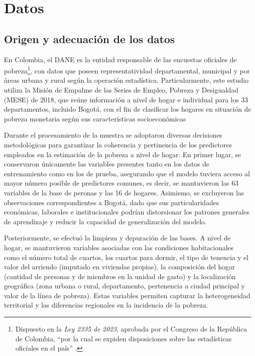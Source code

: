 \section{Datos}


\subsection{Origen y adecuación de los datos}
En Colombia, el DANE es la entidad responsable de las encuestas oficiales de pobreza\footnote{Dispuesto en la \textit{Ley 2335 de 2023}, aprobada por el Congreso de la República de Colombia, ``por la cual se expiden disposiciones sobre las estadísticas oficiales en el país'' \cite{Ley2335_2023}.}, con datos que poseen representatividad departamental, municipal y por áreas urbana y rural según la operación estadística. Particularmente, este estudio utiliza la Misión de Empalme de las Series de Empleo, Pobreza y Desigualdad (MESE) de 2018, que reúne información a nivel de hogar e individual para los 33 departamentos, incluido Bogotá, con el fin de clasificar los hogares en situación de pobreza monetaria según sus características socioeconómicas

Durante el procesamiento de la muestra se adoptaron diversas decisiones metodológicas para garantizar la coherencia y pertinencia de los predictores empleados en la estimación de la pobreza a nivel de hogar. En primer lugar, se conservaron únicamente las variables presentes tanto en los datos de entrenamiento como en los de prueba, asegurando que el modelo tuviera acceso al mayor número posible de predictores comunes, es decir, se mantuvieron las 63 variables de la base de peronas y las 16 de hogares. Asimismo, se excluyeron las observaciones correspondientes a Bogotá, dado que sus particularidades económicas, laborales e institucionales podrían distorsionar los patrones generales de aprendizaje y reducir la capacidad de generalización del modelo.

Posteriormente, se efectuó la limpieza y depuración de las bases. A nivel de hogar, se mantuvieron variables asociadas con las condiciones habitacionales como el número total de cuartos, los cuartos para dormir, el tipo de tenencia y el valor del arriendo (imputado en viviendas propias), la composición del hogar (cantidad de personas y de miembros en la unidad de gasto) y la localización geográfica (zona urbana o rural, departamento, pertenencia a ciudad principal y valor de la línea de pobreza). Estas variables permiten capturar la heterogeneidad territorial y las diferencias regionales en la incidencia de la pobreza.

